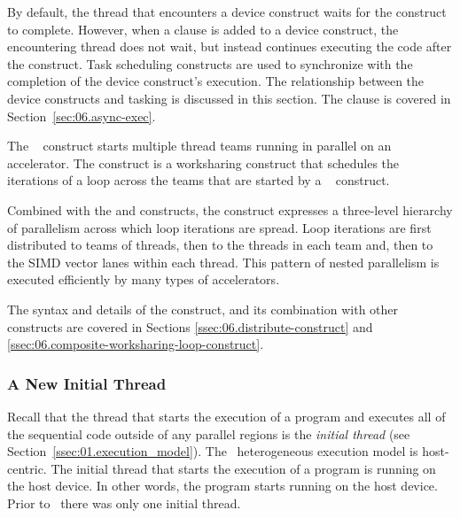 By default, the thread that encounters a device construct waits for the
construct to complete.  However, when a  clause is added to a
device construct, the encountering thread does not wait, but instead continues
executing the code after the construct.  Task scheduling constructs are
used to synchronize with the completion of the device construct's execution.
The relationship between the device constructs and tasking is discussed in
this section. The  clause is covered in Section~\ref{sec:06.async-exec}.


The ~ construct starts multiple thread teams running
in parallel on an accelerator.  The  construct is a
worksharing construct that schedules the iterations of a loop across the teams
that are started by a ~ construct.

Combined with the  and  constructs, the
 construct expresses a three-level hierarchy of parallelism
across which loop iterations are spread.  Loop iterations are first distributed
to teams of threads, then to the threads in each team and, then to the SIMD
vector lanes within each thread.  This pattern of nested parallelism is
executed efficiently by many types of accelerators.

The syntax and details of the  construct, and its combination
with other constructs are covered in Sections \ref{ssec:06.distribute-construct}
and \ref{ssec:06.composite-worksharing-loop-construct}.

\subsubsection{A New Initial Thread}
\label{ssec:06.initial-thread}

Recall that the thread that starts the execution of a program and executes all
of the sequential code outside of any parallel regions is the \emph{initial
thread} (see Section~\ref{ssec:01.execution_model}).  The \OMP\ heterogeneous
execution model is host-centric.  The initial thread that starts the execution
of a program is running on the host device.  In other words, the program starts
running on the host device.  Prior to \OMPfourzero\, there was only one initial thread.

